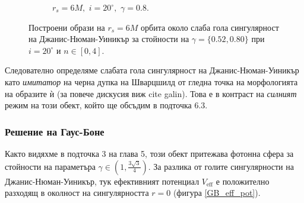 \begin{figure}[!htb]
\begin{subfigure}{6cm}
		\caption{$r_s = 6M,\,\, i = 20^\circ,\,\,\gamma = 0.8$.}
	\end{subfigure}
	\caption[Построени образи на $r_s = 6M$ орбита около слаба гола сингулярност на Джанис-Нюман-Уиникър за различни стойности на $\gamma$ при $i = 20^\circ$.]{\small Построени образи на $r_s = 6M$ орбита около слаба гола сингулярност на Джанис-Нюман-Уиникър за стойности на $\gamma = \{0.52, 0.80\}$ при $i = 20^\circ$ и $n\in[0,4]$.} 
	\label{JNW_r6_20_deg}
\end{figure}

Следователно определяме слабата гола сингулярност на Джанис-Нюман-Уиникър като \emph{имитатор} на черна дупка на Шварцшилд от гледна точка на морфологията на образите ѝ (за повече дискусия виж cite galin). Това е в контраст на \emph{силният} режим на този обект, който ще обсъдим в подточка 6.3.

\subsubsection{Решение на Гаус-Боне} 
Както видяхме в подточка 3 на глава 5, този обект притежава фотонна сфера за стойности на параметъра $\gamma\in\left(1,\frac{3\sqrt{3}}{4}\right)$. За разлика от голите сингулярности на Джанис-Нюман-Уиникър, тук ефективният потенциал $V_\text{eff}$ е положително разходящ в околност на сингулярността $r = 0$ (фигура \ref{GB_eff_pot}).


